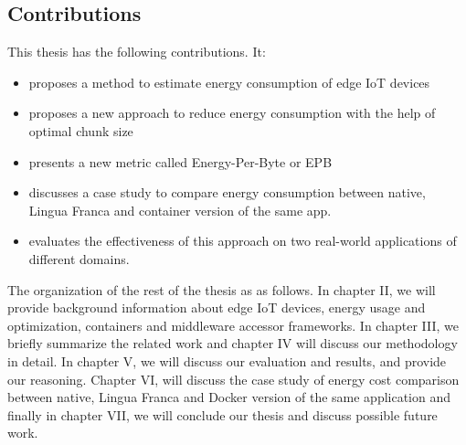 \subsection{Contributions}
This thesis has the following contributions. It: 
\begin{itemize}
    \item proposes a method to estimate energy consumption of edge IoT devices 
    \item proposes a new approach to reduce energy consumption with the help of optimal chunk size
    \item presents a new metric called Energy-Per-Byte or EPB
    \item discusses a case study to compare energy consumption between native, Lingua Franca 
    and container version of the same app.
    \item evaluates the effectiveness of this approach on two real-world applications of different domains.
\end{itemize}

The organization of the rest of the thesis as as follows. In chapter II, we will provide 
background information about edge IoT devices, energy usage and optimization, containers and middleware 
accessor frameworks. In chapter III, we briefly summarize the related work and chapter IV will discuss 
our methodology in detail. In chapter V, we will discuss our evaluation and results, and provide 
our reasoning. Chapter VI, will discuss the case study of energy cost comparison between native, 
Lingua Franca and Docker version of the same application and finally in chapter VII, we will conclude 
our thesis and discuss possible future work.
